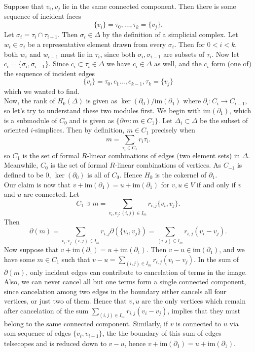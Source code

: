 \documentclass{article}
\theoremstyle{definition}
\newcommand{\im}{\text{im}}
\begin{document}
Suppose that $v_i, v_j$ lie in the same connected component. Then
there is some sequence of incident faces
\[
	\{v_i\}  = \tau_0, \ldots, \tau_k = \{v_j\}.
\] 
Let $\sigma_i = \tau_i \cap \tau_{i + 1}$. Then $\sigma_i \in \Delta$ by the
definition of a simplicial complex. Let $w_i \in \sigma_i$ be a representative
element drawn from every $\sigma_i$. Then for $0 < i < k$, both $w_i$ and $w_{i
- 1}$ must lie in $\tau_i$, since both $\sigma_i, \sigma_{i - 1}$ are subsets
of $\tau_i$. Now let $c_i = \{ \sigma_i, \sigma_{i - 1} \} $. Since $c_i
\subset \tau_i \in \Delta$ we have $c_i \in \Delta$ as well, and the $c_i$ form
(one of) the sequence of incident edges 
\[
	\{v_i\}  = \tau_0, c_1 \ldots, c_{k - 1}, \tau_k = \{v_j\}
\] 
which we wanted to find. \\

Now, the rank of $H_0(\Delta)$ is given as $\ker(\partial_0)/\im(\partial_1)$
where $\partial_i : C_i \to C_{i - 1}$, so let's try to understand these two
modules first. We begin with $\im(\partial_1)$, which is a submodule of $C_0$
and is given as $\{ \partial m : m \in C_1 \}$. Let $\Delta_i \subset \Delta$
be the subset of oriented $i$-simplices. Then by definition, $m \in C_1$
precisely when
\[
	m 
	=
	\sum_{\tau_i \in C_1}
	r_i \tau_i.
\]
so $C_1$ is the set of formal $R$-linear combinations of edges (two element
sets) in $\Delta$. Meanwhile, $C_0$ is the set of formal $R$-linear
combinations of vertices. As $C_{-1}$ is defined to be $0$, $\ker(\partial_0)$
is all of $C_0$. Hence $H_0$ is the cokernel of $\partial_1$. \\

Our claim is now that $v + \im(\partial_1) = u + \im(\partial_1)$ for $v, u \in
V$ if and only if $v$ and $u$ are connected. Let
\[
	C_1 \ni m 
	=
	\sum_{v_i, v_j : (i,j) \in I_m} r_{i, j} \{v_i,v_j\}.
\]
Then 
\[
	\partial(m)
	=
	\sum_{v_i, v_j : (i,j) \in I_m} r_{i, j} \partial(\{v_i,v_j\})
	=
	\sum_{(i,j) \in I_m} r_{i, j} (v_i - v_j).
\] 
Now suppose that $v + \im(\partial_1) = u + \im(\partial_1)$. Then $v - u \in
\im(\partial_1)$, and we have some $m \in C_1$ such that $v - u = \sum_{(i,j)
\in I_m} r_{i, j} (v_i - v_j)$. In the sum of $\partial(m)$, only incident
edges can contribute to cancelation of terms in the image. Also, we can never
cancel all but one terms form a single connected component, since cancelation
among two edges in the boundary either cancels all four vertices, or just two
of them. Hence that $v, u$ are the only vertices which remain after cancelation
of the sum $\sum_{(i,j) \in I_m} r_{i, j} (v_i - v_j)$, implies that they must
belong to the same connected component. Similarly, if $v$ is connected to $u$
via som sequence of edges $\{v_i, v_{i + 1}\}$, the the boundary of this sum of
edges telsecopes and is reduced down to $v - u$, hence $v + \im(\partial_1) = u
+ \im(\partial_1)$. \\
\end{document}
